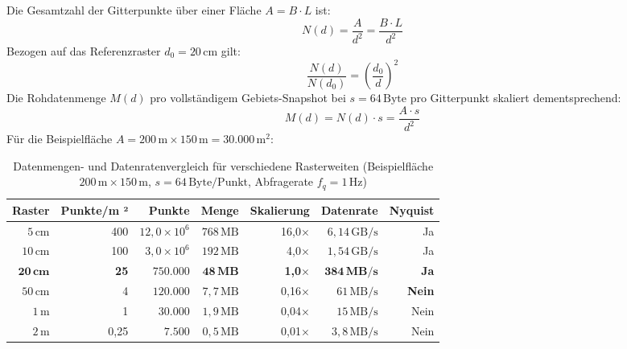 ﻿\documentclass[a4paper,12pt]{article}
\theoremstyle{definition}
\begin{document}
Die Gesamtzahl der Gitterpunkte über einer Fläche $A = B \cdot L$ ist:
\begin{equation}
  N(d) = \frac{A}{d^2} = \frac{B \cdot L}{d^2}
  \label{eq:Npunkt}
\end{equation}
Bezogen auf das Referenzraster $d_0 = 20\,\text{cm}$ gilt:
\begin{equation}
  \frac{N(d)}{N(d_0)} = \left(\frac{d_0}{d}\right)^2
  \label{eq:skalierung}
\end{equation}
Die Rohdatenmenge $M(d)$ pro vollständigem Gebiets-Snapshot bei
$s = 64\,\text{Byte}$ pro Gitterpunkt skaliert dementsprechend:
\begin{equation}
  M(d) = N(d)\cdot s = \frac{A \cdot s}{d^2}
  \label{eq:datenmenge}
\end{equation}
Für die Beispielfläche $A = 200\,\text{m} \times 150\,\text{m} = 30.000\,\text{m}^2$:
\begin{table}[H]
\centering
\caption{Datenmengen- und Datenratenvergleich für verschiedene Rasterweiten
         (Beispielfläche $200\,\text{m}\times150\,\text{m}$,
          $s = 64\,\text{Byte/Punkt}$, Abfragerate $f_q = 1\,\text{Hz}$)}
\label{tab:rastervergleich}
\renewcommand{\arraystretch}{1.45}
\begin{tabular}{@{}r r r r r r r@{}}
\toprule
\textbf{Raster} & \textbf{Punkte/m ²} & \textbf{Punkte}
  & \textbf{Menge} & \textbf{Skalierung} & \textbf{Datenrate}
  & \textbf{Nyquist} \\
\midrule
$5\,\text{cm}$  & 400   & $12{,}0\times10^6$ & $768\,\text{MB}$ & 16{,}0$\times$  & $6{,}14\,\text{GB/s}$ & Ja \\
$10\,\text{cm}$ & 100   & $3{,}0\times10^6$  & $192\,\text{MB}$ &  4{,}0$\times$  & $1{,}54\,\text{GB/s}$ & Ja \\
$\mathbf{20\,\text{cm}}$ & \textbf{25} & $\mathbf{750.000}$ & $\mathbf{48\,\text{MB}}$ & \textbf{1,0$\times$} & $\mathbf{384\,\text{MB/s}}$ & \textbf{Ja} \\
$50\,\text{cm}$ & 4     & $120.000$          & $7{,}7\,\text{MB}$ &  0{,}16$\times$ & $61\,\text{MB/s}$ & \textbf{Nein} \\
$1\,\text{m}$   & 1     & $30.000$           & $1{,}9\,\text{MB}$ &  0{,}04$\times$ & $15\,\text{MB/s}$ & Nein \\
$2\,\text{m}$   & 0{,}25 & $7.500$           & $0{,}5\,\text{MB}$ &  0{,}01$\times$ & $3{,}8\,\text{MB/s}$ & Nein \\
\bottomrule
\end{tabular}
\end{table}
\end{document}
